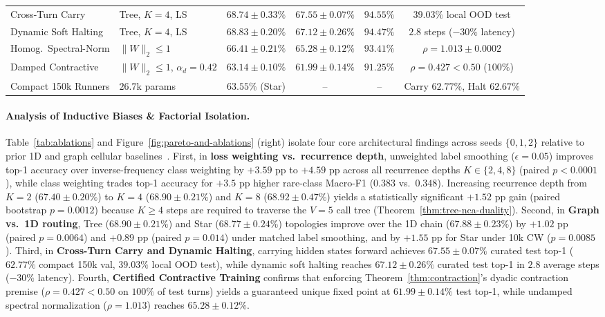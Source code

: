 \documentclass[10pt,twocolumn,letterpaper]{article}
\begin{document}
\begin{table}[tbp]
\begin{tabular*}{\textwidth}{@{\extracolsep{\fill}}llcccc@{}}
\midrule
Cross-Turn Carry & Tree, $K{=}4$, LS & $68.74 \pm 0.33\%$ & $67.55 \pm 0.07\%$ & $94.55\%$ & $39.03\%$ local OOD test \\
Dynamic Soft Halting & Tree, $K{=}4$, LS & $68.83 \pm 0.20\%$ & $67.12 \pm 0.26\%$ & $94.47\%$ & $2.8$ steps ($-30\%$ latency) \\
Homog.\ Spectral-Norm & $\|W\|_2 \le 1$ & $66.41 \pm 0.21\%$ & $65.28 \pm 0.12\%$ & $93.41\%$ & $\rho = 1.013 \pm 0.0002$ \\
Damped Contractive & $\|W\|_2 \le 1$, $\alpha_d{=}0.42$ & $63.14 \pm 0.10\%$ & $61.99 \pm 0.14\%$ & $91.25\%$ & $\rho = \mathbf{0.427 < 0.50}$ ($100\%$) \\
\midrule
Compact 150k Runners & $26.7\text{k}$ params & $63.55\%$ (Star) & -- & -- & Carry $62.77\%$, Halt $62.67\%$ \\
\bottomrule
\end{tabular*}
\end{table}

\paragraph{Analysis of Inductive Biases \& Factorial Isolation.}
Table~\ref{tab:ablations} and Figure~\ref{fig:pareto-and-ablations} (right) isolate four core architectural findings across seeds $\{0,1,2\}$ relative to prior 1D and graph cellular baselines~\cite{mittal2026textnca,grattarola2021learning}. First, in \textbf{loss weighting vs.\ recurrence depth}, unweighted label smoothing ($\epsilon=0.05$) improves top-1 accuracy over inverse-frequency class weighting by $+3.59\text{ pp}$ to $+4.59\text{ pp}$ across all recurrence depths $K \in \{2, 4, 8\}$ (paired $p < 0.0001$), while class weighting trades top-1 accuracy for $+3.5\text{ pp}$ higher rare-class Macro-F1 ($0.383$ vs.\ $0.348$). Increasing recurrence depth from $K=2$ ($67.40 \pm 0.20\%$) to $K=4$ ($68.90 \pm 0.21\%$) and $K=8$ ($68.92 \pm 0.47\%$) yields a statistically significant $+1.52\text{ pp}$ gain (paired bootstrap $p = 0.0012$) because $K \ge 4$ steps are required to traverse the $V=5$ call tree (Theorem~\ref{thm:tree-nca-duality}). Second, in \textbf{Graph vs.\ 1D routing}, Tree ($68.90 \pm 0.21\%$) and Star ($68.77 \pm 0.24\%$) topologies improve over the 1D chain ($67.88 \pm 0.23\%$) by $+1.02\text{ pp}$ (paired $p = 0.0064$) and $+0.89\text{ pp}$ (paired $p = 0.014$) under matched label smoothing, and by $+1.55\text{ pp}$ for Star under 10k CW ($p = 0.0085$). Third, in \textbf{Cross-Turn Carry and Dynamic Halting}, carrying hidden states forward achieves $67.55 \pm 0.07\%$ curated test top-1 ($62.77\%$ compact 150k val, $39.03\%$ local OOD test), while dynamic soft halting reaches $67.12 \pm 0.26\%$ curated test top-1 in $2.8$ average steps ($-30\%$ latency). Fourth, \textbf{Certified Contractive Training} confirms that enforcing Theorem~\ref{thm:contraction}'s dyadic contraction premise ($\rho = 0.427 < 0.50$ on $100\%$ of test turns) yields a guaranteed unique fixed point at $61.99 \pm 0.14\%$ test top-1, while undamped spectral normalization ($\rho = 1.013$) reaches $65.28 \pm 0.12\%$.
\end{document}
